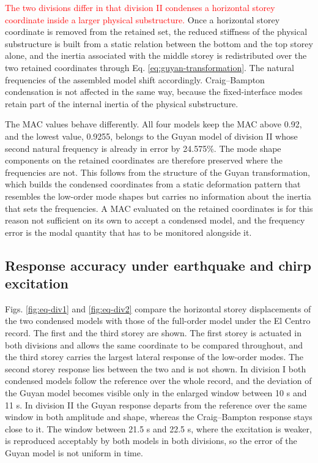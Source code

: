 \documentclass[11pt,a4paper]{article}
\numberwithin{equation}{section}
\newcommand{\rev}[1]{\textcolor{red}{#1}}
\begin{document}
\rev{The two divisions differ in that division II condenses a horizontal storey coordinate inside a larger physical substructure.} Once a horizontal storey coordinate is removed from the retained set, the reduced stiffness of the physical substructure is built from a static relation between the bottom and the top storey alone, and the inertia associated with the middle storey is redistributed over the two retained coordinates through Eq. \eqref{eq:guyan-transformation}. The natural frequencies of the assembled model shift accordingly. Craig--Bampton condensation is not affected in the same way, because the fixed-interface modes retain part of the internal inertia of the physical substructure.

The MAC values behave differently. All four models keep the MAC above 0.92, and the lowest value, 0.9255, belongs to the Guyan model of division II whose second natural frequency is already in error by 24.575\%. The mode shape components on the retained coordinates are therefore preserved where the frequencies are not. This follows from the structure of the Guyan transformation, which builds the condensed coordinates from a static deformation pattern that resembles the low-order mode shapes but carries no information about the inertia that sets the frequencies. A MAC evaluated on the retained coordinates is for this reason not sufficient on its own to accept a condensed model, and the frequency error is the modal quantity that has to be monitored alongside it.

\subsection{Response accuracy under earthquake and chirp excitation}
\label{sec:response-accuracy}

Figs. \ref{fig:eq-div1} and \ref{fig:eq-div2} compare the horizontal storey displacements of the two condensed models with those of the full-order model under the El Centro record. The first and the third storey are shown. The first storey is actuated in both divisions and allows the same coordinate to be compared throughout, and the third storey carries the largest lateral response of the low-order modes. The second storey response lies between the two and is not shown. In division I both condensed models follow the reference over the whole record, and the deviation of the Guyan model becomes visible only in the enlarged window between 10 s and 11 s. In division II the Guyan response departs from the reference over the same window in both amplitude and shape, whereas the Craig--Bampton response stays close to it. The window between 21.5 s and 22.5 s, where the excitation is weaker, is reproduced acceptably by both models in both divisions, so the error of the Guyan model is not uniform in time.
\end{document}
